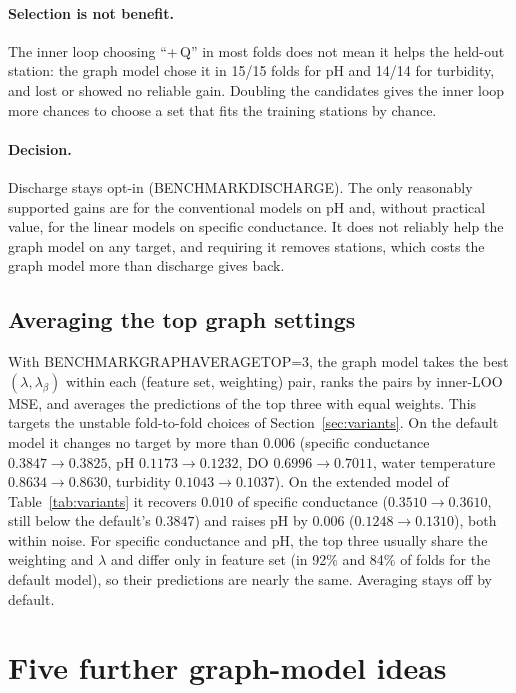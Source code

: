 \documentclass[11pt]{article}
\newcommand{\codeus}{\textunderscore\allowbreak}
\newcommand{\code}[1]{{\ttfamily\let\_\codeus #1}}
\begin{document}
\paragraph{Selection is not benefit.} The inner loop choosing ``+\,Q'' in most folds does not mean
it helps the held-out station: the graph model chose it in 15/15 folds for pH and 14/14 for
turbidity, and lost or showed no reliable gain. Doubling the candidates gives the inner loop more
chances to choose a set that fits the training stations by chance.

\paragraph{Decision.} Discharge stays opt-in (\code{BENCHMARK\_DISCHARGE}). The only reasonably
supported gains are for the conventional models on pH and, without practical value, for the linear
models on specific conductance. It does not reliably help the graph model on any target, and
requiring it removes stations, which costs the graph model more than discharge gives back.

\subsection{Averaging the top graph settings}
\label{sec:averaging}

With \code{BENCHMARK\_GRAPH\_AVERAGE\_TOP=3}, the graph model takes the best $(\lambda,\lambda_\beta)$
within each (feature set, weighting) pair, ranks the pairs by inner-LOO MSE, and averages the
predictions of the top three with equal weights. This targets the unstable fold-to-fold choices of
Section~\ref{sec:variants}. On the default model it changes no target by more than $0.006$
(specific conductance $0.3847\to0.3825$, pH $0.1173\to0.1232$, DO $0.6996\to0.7011$, water
temperature $0.8634\to0.8630$, turbidity $0.1043\to0.1037$). On the extended model of
Table~\ref{tab:variants} it recovers $0.010$ of specific conductance ($0.3510\to0.3610$, still below
the default's $0.3847$) and raises pH by $0.006$ ($0.1248\to0.1310$), both within noise. For
specific conductance and pH, the top three usually share the weighting and $\lambda$ and differ only
in feature set (in 92\% and 84\% of folds for the default model), so their predictions are nearly
the same. Averaging stays off by default.

\section{Five further graph-model ideas}
\label{sec:ideas}
\end{document}
